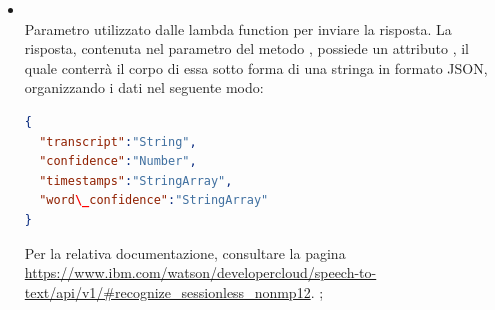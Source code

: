 \begin{itemize}
\begin{itemize}
\begin{itemize}
\begin{lstlisting}[language=json,firstnumber=1]
}
\end{lstlisting};
			\item {} \\
			Parametro utilizzato dalle lambda function per inviare la risposta. La risposta, contenuta nel  parametro del metodo , possiede un attributo , il quale conterrà il corpo di essa sotto forma di una stringa in formato JSON, organizzando i dati nel seguente modo:
\begin{lstlisting}[language=json,firstnumber=1]
{
  "transcript":"String",
  "confidence":"Number",
  "timestamps":"StringArray",
  "word\_confidence":"StringArray"
}
\end{lstlisting}
Per la relativa documentazione, consultare la pagina \url{https://www.ibm.com/watson/developercloud/speech-to-text/api/v1/#recognize\_sessionless\_nonmp12}.
;
		\end{itemize}
	\end{itemize}
\end{itemize}
\FloatBarrier

